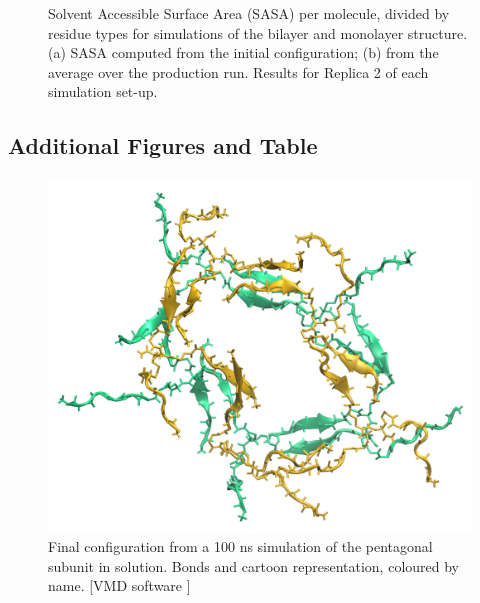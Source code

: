\begin{figure}[t!]
\centering
{} 
\caption[(SI) Replica 2: SASA per residue of monolayer and bilater]{Solvent Accessible Surface Area (SASA) per molecule, divided by residue types for simulations of the bilayer and monolayer structure. (a) SASA computed from the initial configuration; (b) from the average over the production run. Results for Replica 2 of each simulation set-up.}
\label{fig:mono_bi_sasa2}
\end{figure}

\clearpage


\subsection{Additional Figures and Table}
\begin{figure}[h!]
\centering
\includegraphics[width=0.5\linewidth]{3results_capsule/pics/penta_final.png}
\caption[(SI) Pentagonal subunit atomistic simulation: final configuration]{Final configuration from a 100 ns simulation of the pentagonal subunit in solution. Bonds and cartoon representation, coloured by name. [VMD software \citet{HUMP96}]}
\label{fig:penta_results_SI}
\end{figure}

